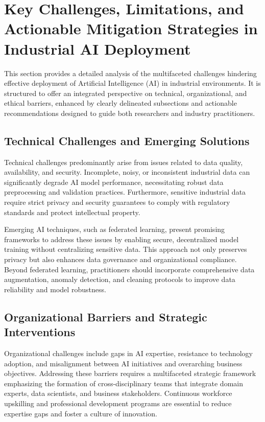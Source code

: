 \documentclass[sigconf]{acmart}
\begin{document}
\section{Key Challenges, Limitations, and Actionable Mitigation Strategies in Industrial AI Deployment}

This section provides a detailed analysis of the multifaceted challenges hindering effective deployment of Artificial Intelligence (AI) in industrial environments. It is structured to offer an integrated perspective on technical, organizational, and ethical barriers, enhanced by clearly delineated subsections and actionable recommendations designed to guide both researchers and industry practitioners.

\subsection{Technical Challenges and Emerging Solutions}

Technical challenges predominantly arise from issues related to data quality, availability, and security. Incomplete, noisy, or inconsistent industrial data can significantly degrade AI model performance, necessitating robust data preprocessing and validation practices. Furthermore, sensitive industrial data require strict privacy and security guarantees to comply with regulatory standards and protect intellectual property. 

Emerging AI techniques, such as federated learning, present promising frameworks to address these issues by enabling secure, decentralized model training without centralizing sensitive data. This approach not only preserves privacy but also enhances data governance and organizational compliance. Beyond federated learning, practitioners should incorporate comprehensive data augmentation, anomaly detection, and cleaning protocols to improve data reliability and model robustness.

\subsection{Organizational Barriers and Strategic Interventions}

Organizational challenges include gaps in AI expertise, resistance to technology adoption, and misalignment between AI initiatives and overarching business objectives. Addressing these barriers requires a multifaceted strategic framework emphasizing the formation of cross-disciplinary teams that integrate domain experts, data scientists, and business stakeholders. Continuous workforce upskilling and professional development programs are essential to reduce expertise gaps and foster a culture of innovation.
\end{document}
